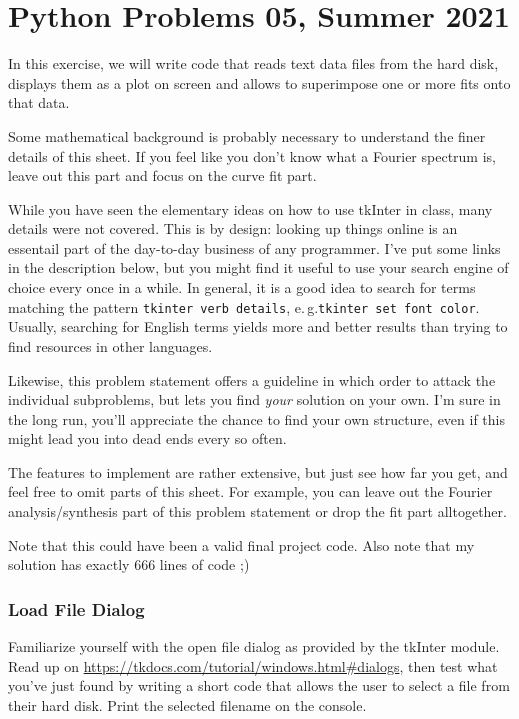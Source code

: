 \documentclass[
	english,
	fontsize=10pt,
	parskip=half,
	titlepage=true,
	DIV=12
]{scrartcl}
\newcommand*{\eg}{e.\,g.\xspace}
\begin{document}
\part*{Python Problems 05, Summer 2021}
In this exercise, we will write code that reads text data files from the hard disk, displays them as a plot on screen and allows to superimpose one or more fits onto that data.

Some mathematical background is probably necessary to understand the finer details of this sheet. If you feel like you don't know what a Fourier spectrum is, leave out this part and focus on the curve fit part.

While you have seen the elementary ideas on how to use tkInter in class, many details were not covered. This is by design: looking up things online is an essentail part of the day-to-day business of any programmer. I've put some links in the description below, but you might find it useful to use your search engine of choice every once in a while. In general, it is a good idea to search for terms matching the pattern \texttt{tkinter verb details}, \eg \texttt{tkinter set font color}. Usually, searching for English terms yields more and better results than trying to find resources in other languages.

Likewise, this problem statement offers a guideline in which order to attack the individual subproblems, but lets you find \emph{your} solution on your own. I'm sure in the long run, you'll appreciate the chance to find your own structure, even if this might lead you into dead ends every so often.

The features to implement are rather extensive, but just see how far you get, and feel free to omit parts of this sheet. For example, you can leave out the Fourier analysis/synthesis part of this problem statement or drop the fit part alltogether.

Note that this could have been a valid final project code. Also note that my solution has exactly 666 lines of code ;)

\section{Load File Dialog}
Familiarize yourself with the open file dialog as provided by the tkInter module. Read up on \url{https://tkdocs.com/tutorial/windows.html#dialogs}, then test what you've just found by writing a short code that allows the user to select a file from their hard disk. Print the selected filename on the console.
\end{document}
